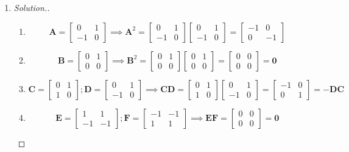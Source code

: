 \begin{enumerate}
\item 
\begin{proof}[Solution.]
\begin{enumerate}
\item \[\bm A = \begin{bmatrix}0 & 1 \\ -1 & 0\end{bmatrix}
\implies \bm A^2 = \begin{bmatrix}0 & 1 \\ -1 & 0\end{bmatrix}\begin{bmatrix}0 & 1 \\ -1 & 0\end{bmatrix} 
= \begin{bmatrix}-1 & 0 \\ 0 & -1\end{bmatrix}\]
\item
\[\bm B = \begin{bmatrix}0 & 1 \\ 0 & 0\end{bmatrix}
\implies \bm B^2 = \begin{bmatrix}0 & 1 \\ 0 & 0\end{bmatrix}\begin{bmatrix}0 & 1 \\ 0 & 0\end{bmatrix} 
= \begin{bmatrix}0 & 0 \\ 0 & 0\end{bmatrix} = \bm 0 \]
\item
\[
\bm C = \begin{bmatrix}0 & 1 \\ 1 & 0\end{bmatrix};\bm D = \begin{bmatrix}0 & 1 \\ -1 & 0\end{bmatrix}
\implies \bm{CD} = \begin{bmatrix}0 & 1 \\ 1 & 0\end{bmatrix}\begin{bmatrix}0 & 1 \\ -1 & 0\end{bmatrix} = 
\begin{bmatrix}-1 & 0 \\ 0 & 1\end{bmatrix} = -\bm{DC}
\]
\item
\[\bm E = \begin{bmatrix}1 & 1 \\ -1 & -1\end{bmatrix};\bm F = \begin{bmatrix}-1 & -1 \\ 1 & 1\end{bmatrix}
\implies \bm{EF} = \begin{bmatrix}0 & 0 \\ 0 & 0\end{bmatrix}= \bm{0}
\]
\end{enumerate}\end{proof}


\end{enumerate}

